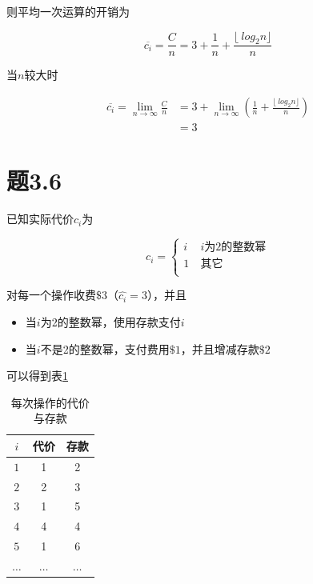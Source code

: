 \documentclass[a4paper,twoside]{article}
\begin{document}
\begin{spacing}{1.2}
则平均一次运算的开销为

$$
\overline{c_i}=\frac{C}{n} = 3+\frac{1}{n}+\frac{\lfloor\ log_2 n \rfloor}{n} 
$$

当$n$较大时

\begin{align*}
	\overline{c_i}=\lim_{n \to \infty}\frac{C}{n} &= 3+\lim_{n \to \infty}(\frac{1}{n}+\frac{\lfloor\ log_2 n \rfloor}{n}) \\
	&=3
\end{align*}

\section{题3.6}

已知实际代价$c_i$为

$$ c_i=\left\{
\begin{aligned}
	i & \  \mbox{$i$为$2$的整数幂} \\
	1 & \  \mbox{其它} \\
\end{aligned}
\right.
$$

对每一个操作收费$\$3$（$\hat{c_i}=3$），并且
\begin{itemize}
	\item 当$i$为2的整数幂，使用存款支付$i$
	\item 当$i$不是2的整数幂，支付费用$\$1$，并且增减存款$\$2$
\end{itemize}

可以得到表\ref{tbl:p36costs}

\begin{table}[h]
	\renewcommand{\arraystretch}{1.2}
	\caption{每次操作的代价与存款}
	\label{tbl:p36costs}
	\begin{center}
		{\footnotesize
			\begin{tabular}{|c|c|c|}
				\hline
				{$i$} & {代价} & {存款} \\
				\hline
				$1$ & 1 & 2 \\
				\hline
				$2$ & 2 & 3\\
				\hline
				$3$ & 1 & 5\\
				\hline
				$4$ & 4 & 4\\
				\hline
				$5$ & 1 & 6\\
				\hline
				$\dots$ & $\dots$ & $\dots$ \\
				\hline
		\end{tabular}}
	\end{center}
\end{table}


\end{spacing}
\end{document}
